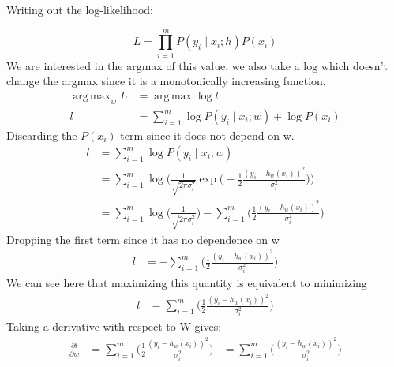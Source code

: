 \documentclass[12pt]{article}
\newenvironment{problem}[2][Problem]{\begin{trivlist}
\item[\hskip \labelsep {\bfseries #1}\hskip \labelsep {\bfseries #2.}]}{\end{trivlist}}
\DeclareMathOperator*{\argmax}{arg\,max}
\begin{document}
\begin{problem}{2.}
Writing out the log-likelihood:
\end{problem}
\[
    L = \prod_{i=1}^{m} P(y_i \mid x_i ; h ) P(x_i)
\]
We are interested in the argmax of this value, we 
also take a log which doesn't change the argmax since it 
is a monotonically increasing function.
\begin{align*}
    \argmax_w L &= \argmax \log l \\
    l &= \sum_{i=1}^{m} \log P(y_i \mid x_i ; w ) + \log P(x_i)
\end{align*}
Discarding the $P(x_i)$ term since it does not depend on w.
\begin{align*}
    l &= \sum_{i=1}^{m} \log P(y_i \mid x_i ; w ) \\
      &= \sum_{i=1}^{m} \log \Bigg( \frac{1}{\sqrt{2\pi\sigma_i^2}} \exp \Big(-\frac{1}{2} \frac{(y_i - h_w(x_i))^2}{\sigma_i^2} \Big) \Bigg) \\ 
      &= \sum_{i=1}^{m} \log \Big( \frac{1}{\sqrt{2\pi\sigma_i^2}} \Big) - \sum_{i=1}^{m} \Big(\frac{1}{2} \frac{(y_i - h_w(x_i))^2}{\sigma_i^2} \Big)
\end{align*}
Dropping the first term since it has no dependence on w
\begin{align*}
    l  &= -\sum_{i=1}^{m} \Big(\frac{1}{2} \frac{(y_i - h_w(x_i))^2}{\sigma_i^2} \Big)
\end{align*}
We can see here that maximizing this quantity is equivalent to minimizing
\begin{align*}
    l  &= \sum_{i=1}^{m} \Big(\frac{1}{2} \frac{(y_i - h_w(x_i))^2}{\sigma_i^2} \Big)
\end{align*}
Taking a derivative with respect to W gives:
\begin{align*}
    \frac{\partial l}{\partial w} &= \sum_{i=1}^{m} \Big(\frac{1}{2} \frac{(y_i - h_w(x_i))^2}{\sigma_i^2} \Big)
                                  &= \sum_{i=1}^{m} \Big(\frac{(y_i - h_w(x_i))^2}{\sigma_i^2} \Big)
\end{align*}

\begin{problem}{3. (a)}
\end{problem}

\begin{problem}{3. (b)}
\end{problem}

\begin{problem}{3. (c)}
\end{problem}

\begin{problem}{4.}
\end{problem}
\end{document}
